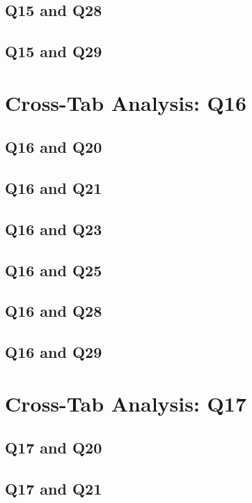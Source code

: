 \documentclass{report}
\begin{document}
\section{Q15 and Q28}\clearpage
\section{Q15 and Q29}\clearpage

\chapter{Cross-Tab Analysis: Q16}

\section{Q16 and Q20}\clearpage
\section{Q16 and Q21}\clearpage
\section{Q16 and Q23}\clearpage
\section{Q16 and Q25}\clearpage
\section{Q16 and Q28}\clearpage
\section{Q16 and Q29}\clearpage

\chapter{Cross-Tab Analysis: Q17}

\section{Q17 and Q20}\clearpage
\section{Q17 and Q21}\clearpage
\end{document}
